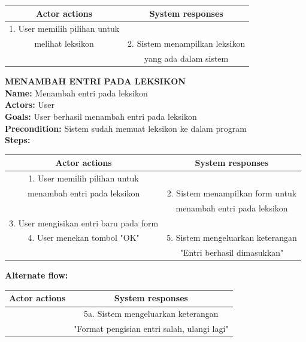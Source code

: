 \begin{table}[H]
\centering
\begin{tabular}{|c|c|}
\hline
\textbf{Actor actions} & \textbf{System responses} \\
\hline
1. User memilih pilihan untuk&\\melihat leksikon&
2. Sistem menampilkan leksikon\\&yang ada dalam sistem \\
\hline
\end{tabular}
\end{table}

\textbf{MENAMBAH ENTRI PADA LEKSIKON}\\
\textbf{Name:} Menambah entri pada leksikon\\
\textbf{Actors:} User\\
\textbf{Goals:} User berhasil menambah entri pada leksikon\\
\textbf{Precondition:} Sistem sudah memuat leksikon ke dalam program\\
\textbf{Steps:}

\begin{table}[H]
\centering
\begin{tabular}{|c|c|}
\hline
\textbf{Actor actions} & \textbf{System responses} \\
\hline
1. User memilih pilihan untuk&\\ menambah entri pada leksikon&
2. Sistem menampilkan form untuk \\&menambah entri pada leksikon\\
3. User mengisikan entri baru pada form&\\
4. User menekan tombol "OK"&
5. Sistem mengeluarkan keterangan \\&"Entri berhasil dimasukkan"\\
\hline
\end{tabular}
\end{table}

\textbf{Alternate flow:}

\begin{table}[H]
\centering
\begin{tabular}{|c|c|}
\hline
\textbf{Actor actions} & \textbf{System responses} \\
\hline
&5a. Sistem mengeluarkan keterangan \\&"Format pengisian entri salah, ulangi lagi"\\
\hline
\end{tabular}
\end{table}


